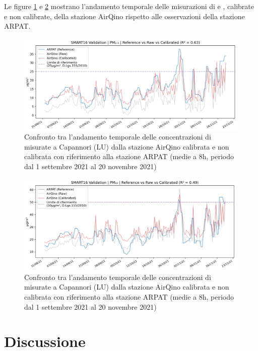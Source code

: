 Le figure \ref{fig:val-pm2.5} e \ref{fig:val-pm10} mostrano l'andamento temporale delle misurazioni di  e , calibrate e non calibrate, della stazione AirQino rispetto alle osservazioni della stazione ARPAT.

\begin{figure}[H]
\centering
\includegraphics[width=\textwidth,height=\textheight,keepaspectratio]{img/val_pm2.5}
\caption{Confronto tra l'andamento temporale delle concentrazioni di  misurate a Capannori (LU) dalla stazione AirQino calibrata e non calibrata con riferimento alla stazione ARPAT (medie a 8h, periodo dal 1 settembre 2021 al 20 novembre 2021)}
\label{fig:val-pm2.5}
\end{figure}

\begin{figure}[H]
\centering
\includegraphics[width=\textwidth,height=\textheight,keepaspectratio]{img/val_pm10}
\caption{Confronto tra l'andamento temporale delle concentrazioni di  misurate a Capannori (LU) dalla stazione AirQino calibrata e non calibrata con riferimento alla stazione ARPAT (medie a 8h, periodo dal 1 settembre 2021 al 20 novembre 2021)}
\label{fig:val-pm10}
\end{figure}

\section{Discussione}\label{sec:discussione}

